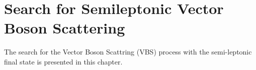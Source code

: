\chapter{Search for Semileptonic Vector Boson Scattering}

The search for the Vector Boson Scattring (VBS) process with the semi-leptonic final state is presented in this chapter.


%

%

%

%

%

%

%

